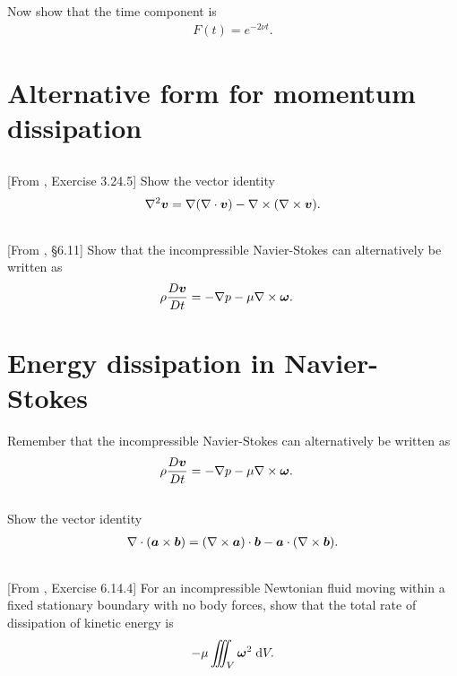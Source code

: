 \documentclass[11pt,letterpaper]{report}
\begin{document}
\subsection{}
Now show that the time component is
\begin{align}
    F(t) = e^{-2\nu t}.
\end{align}

\section{Alternative form for momentum dissipation}
\subsection{}
[From \cite{Aris_62}, Exercise 3.24.5] Show the vector identity
\begin{align}
    \nabla^2 \boldsymbol{v} = \nabla(\nabla\cdot\boldsymbol{v})-\nabla\times(\nabla\times \boldsymbol{v}).
\end{align}

\subsection{}
[From \cite{Aris_62}, \S 6.11] Show that the incompressible Navier-Stokes can alternatively be written as
\begin{align}
    \rho\frac{D\boldsymbol{v}}{Dt} &= -\nabla p-\mu\nabla\times\boldsymbol{\omega}.
\end{align}

\section{Energy dissipation in Navier-Stokes}
Remember that the incompressible Navier-Stokes can alternatively be written as
\begin{align}
    \rho\frac{D\boldsymbol{v}}{Dt} &= -\nabla p-\mu\nabla\times\boldsymbol{\omega}.
\end{align}

\subsection{}
Show the vector identity
\begin{align}
    \nabla\cdot(\boldsymbol{a}\times\boldsymbol{b}) = (\nabla\times\boldsymbol{a})\cdot\boldsymbol{b}-\boldsymbol{a}\cdot(\nabla\times\boldsymbol{b}).
\end{align}

\subsection{}
[From \cite{Aris_62}, Exercise 6.14.4] For an incompressible Newtonian fluid moving within a fixed stationary boundary with no body forces, show that the total rate of dissipation of kinetic energy is
\begin{align}
    -\mu \iiint_V \boldsymbol{\omega}^2 \;\mathrm{d} V.
\end{align}
\end{document}
